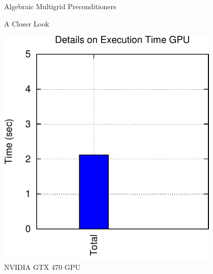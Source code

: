 \begin{frame}{Algebraic Multigrid Preconditioners}
\begin{block}{A Closer Look}
\begin{minipage}{0.48\textwidth}
\begin{center}
   \includegraphics[width=0.8\textwidth]{figures/bench-details-gpu-1.pdf}\\
   NVIDIA GTX 470 GPU
  \end{center}
  \end{minipage}
 \end{block}

 \vspace*{1.97cm}
\end{frame}


